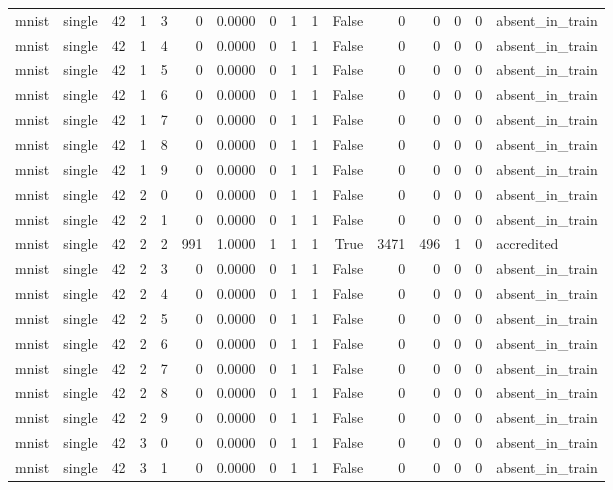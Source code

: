 \begin{tabular}{llrrrrrrrrrrrrrl}
mnist & single & 42 & 1 & 3 & 0 & 0.0000 & 0 & 1 & 1 & False & 0 & 0 & 0 & 0 & absent\_in\_train \\
mnist & single & 42 & 1 & 4 & 0 & 0.0000 & 0 & 1 & 1 & False & 0 & 0 & 0 & 0 & absent\_in\_train \\
mnist & single & 42 & 1 & 5 & 0 & 0.0000 & 0 & 1 & 1 & False & 0 & 0 & 0 & 0 & absent\_in\_train \\
mnist & single & 42 & 1 & 6 & 0 & 0.0000 & 0 & 1 & 1 & False & 0 & 0 & 0 & 0 & absent\_in\_train \\
mnist & single & 42 & 1 & 7 & 0 & 0.0000 & 0 & 1 & 1 & False & 0 & 0 & 0 & 0 & absent\_in\_train \\
mnist & single & 42 & 1 & 8 & 0 & 0.0000 & 0 & 1 & 1 & False & 0 & 0 & 0 & 0 & absent\_in\_train \\
mnist & single & 42 & 1 & 9 & 0 & 0.0000 & 0 & 1 & 1 & False & 0 & 0 & 0 & 0 & absent\_in\_train \\
mnist & single & 42 & 2 & 0 & 0 & 0.0000 & 0 & 1 & 1 & False & 0 & 0 & 0 & 0 & absent\_in\_train \\
mnist & single & 42 & 2 & 1 & 0 & 0.0000 & 0 & 1 & 1 & False & 0 & 0 & 0 & 0 & absent\_in\_train \\
mnist & single & 42 & 2 & 2 & 991 & 1.0000 & 1 & 1 & 1 & True & 3471 & 496 & 1 & 0 & accredited \\
mnist & single & 42 & 2 & 3 & 0 & 0.0000 & 0 & 1 & 1 & False & 0 & 0 & 0 & 0 & absent\_in\_train \\
mnist & single & 42 & 2 & 4 & 0 & 0.0000 & 0 & 1 & 1 & False & 0 & 0 & 0 & 0 & absent\_in\_train \\
mnist & single & 42 & 2 & 5 & 0 & 0.0000 & 0 & 1 & 1 & False & 0 & 0 & 0 & 0 & absent\_in\_train \\
mnist & single & 42 & 2 & 6 & 0 & 0.0000 & 0 & 1 & 1 & False & 0 & 0 & 0 & 0 & absent\_in\_train \\
mnist & single & 42 & 2 & 7 & 0 & 0.0000 & 0 & 1 & 1 & False & 0 & 0 & 0 & 0 & absent\_in\_train \\
mnist & single & 42 & 2 & 8 & 0 & 0.0000 & 0 & 1 & 1 & False & 0 & 0 & 0 & 0 & absent\_in\_train \\
mnist & single & 42 & 2 & 9 & 0 & 0.0000 & 0 & 1 & 1 & False & 0 & 0 & 0 & 0 & absent\_in\_train \\
mnist & single & 42 & 3 & 0 & 0 & 0.0000 & 0 & 1 & 1 & False & 0 & 0 & 0 & 0 & absent\_in\_train \\
mnist & single & 42 & 3 & 1 & 0 & 0.0000 & 0 & 1 & 1 & False & 0 & 0 & 0 & 0 & absent\_in\_train \\

\end{tabular}
